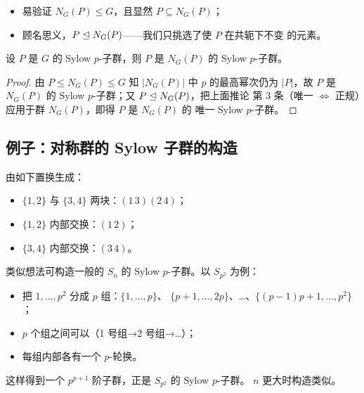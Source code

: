\begin{itemize}[leftmargin=1.3em,itemsep=1pt]
  \item 易验证 $N_G(P)\le G$，且显然 $P\subseteq N_G(P)$；
  \item 顾名思义，$P\trianglelefteq N_G(P)$——我们只挑选了使 $P$ 在共轭下不变
        的元素。
\end{itemize}

\begin{lemma}
设 $P$ 是 $G$ 的 Sylow $p$-子群，则 $P$ 是 $N_G(P)$ 的
Sylow $p$-子群。
\end{lemma}

\begin{proof}
由 $P\le N_G(P)\le G$ 知 $|N_G(P)|$ 中 $p$ 的最高幂次仍为 $|P|$，故
$P$ 是 $N_G(P)$ 的 Sylow $p$-子群；又 $P\trianglelefteq N_G(P)$，把上面推论
第 3 条（唯一 $\iff$ 正规）应用于群 $N_G(P)$，即得 $P$ 是 $N_G(P)$ 的
唯一 Sylow $p$-子群。
\end{proof}

\subsection{例子：对称群的 Sylow 子群的构造}

\begin{example}[$S_4$ 的 Sylow $2$-子群（阶 8）]
由如下置换生成：
\begin{itemize}[leftmargin=1.3em,itemsep=1pt]
  \item $\{1,2\}$ 与 $\{3,4\}$ 两块：$(1\,3)(2\,4)$；
  \item $\{1,2\}$ 内部交换：$(1\,2)$；
  \item $\{3,4\}$ 内部交换：$(3\,4)$。
\end{itemize}
\end{example}

\begin{example}[$S_{p^2}$ 的 Sylow $p$-子群]
类似想法可构造一般的 $S_n$ 的 Sylow $p$-子群。以 $S_{p^2}$ 为例：
\begin{itemize}[leftmargin=1.3em,itemsep=2pt]
  \item 把 $1,\dots,p^2$ 分成 $p$ 组：$\{1,\dots,p\}$、
        $\{p+1,\dots,2p\}$、…、$\{(p-1)p+1,\dots,p^2\}$；
  \item $p$ 个组之间可以（1 号组→2 号组→…）；
  \item 每组内部各有一个 $p$-轮换。
\end{itemize}
这样得到一个 $p^{p+1}$ 阶子群，正是 $S_{p^2}$ 的 Sylow $p$-子群。
$n$ 更大时构造类似。
\end{example}

